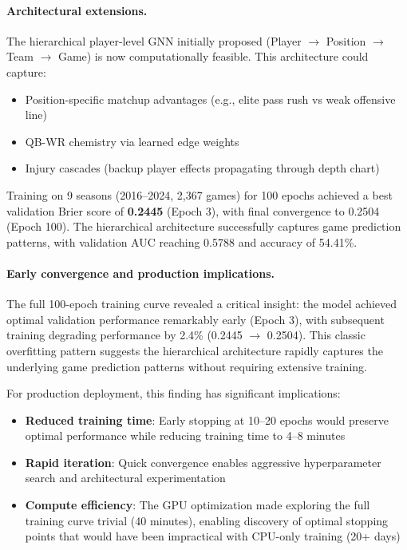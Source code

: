 \paragraph{Architectural extensions.}
The hierarchical player-level GNN initially proposed (Player $\to$ Position $\to$ Team $\to$ Game) is now computationally feasible.
This architecture could capture:
\begin{itemize}
    \item Position-specific matchup advantages (e.g., elite pass rush vs weak offensive line)
    \item QB-WR chemistry via learned edge weights
    \item Injury cascades (backup player effects propagating through depth chart)
\end{itemize}

Training on 9 seasons (2016--2024, 2,367 games) for 100 epochs achieved a best validation Brier score of \textbf{0.2445} (Epoch 3), with final convergence to 0.2504 (Epoch 100).
The hierarchical architecture successfully captures game prediction patterns, with validation AUC reaching 0.5788 and accuracy of 54.41\%.

\paragraph{Early convergence and production implications.}
The full 100-epoch training curve revealed a critical insight: the model achieved optimal validation performance remarkably early (Epoch 3), with subsequent training degrading performance by 2.4\% (0.2445 $\to$ 0.2504).
This classic overfitting pattern suggests the hierarchical architecture rapidly captures the underlying game prediction patterns without requiring extensive training.

For production deployment, this finding has significant implications:
\begin{itemize}
    \item \textbf{Reduced training time}: Early stopping at 10--20 epochs would preserve optimal performance while reducing training time to 4--8 minutes
    \item \textbf{Rapid iteration}: Quick convergence enables aggressive hyperparameter search and architectural experimentation
    \item \textbf{Compute efficiency}: The GPU optimization made exploring the full training curve trivial (40 minutes), enabling discovery of optimal stopping points that would have been impractical with CPU-only training (20+ days)
\end{itemize}

